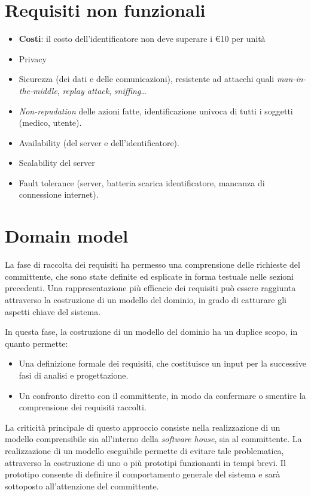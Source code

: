 \documentclass[a4paper,12pt]{report}
\begin{document}
\section{Requisiti non funzionali}
\begin{itemize}
	\item \textbf{Costi}: il costo dell'identificatore non deve superare i \euro 10 per unità
	\item Privacy
	\item Sicurezza (dei dati e delle comunicazioni), resistente ad attacchi quali \emph{man-in-the-middle}, \emph{replay attack}, \emph{sniffing}\dots 
	\item \emph{Non-repudation} delle azioni fatte, identificazione univoca di tutti i soggetti (medico, utente). 
	\item Availability (del server e dell'identificatore).
	\item Scalability del server
	\item Fault tolerance (server, batteria scarica identificatore, mancanza di connessione internet).
\end{itemize}

\section{Domain model}
La fase di raccolta dei requisiti ha permesso una comprensione delle richieste del committente, che sono state definite ed esplicate in forma testuale nelle sezioni precedenti. Una rappresentazione più efficacie dei requisiti può essere raggiunta attraverso la costruzione di un modello del dominio, in grado di catturare gli aspetti chiave del sistema. 

In questa fase, la costruzione di un modello del dominio ha un duplice scopo, in quanto permette:
\begin{itemize}
	\item Una definizione formale dei requisiti, che costituisce un input per la successive fasi di analisi e progettazione.
	\item Un confronto diretto con il committente, in modo da confermare o smentire la comprensione dei requisiti raccolti. 
\end{itemize}

La criticità principale di questo approccio consiste nella realizzazione di un modello comprensibile sia all'interno della \emph{software house}, sia al committente. La realizzazione di un modello eseguibile permette di evitare tale problematica, attraverso la costruzione di uno o più prototipi funzionanti in tempi brevi. Il prototipo consente di definire il comportamento generale del sistema e sarà sottoposto all'attenzione del committente. 
\end{document}
